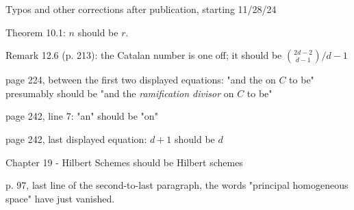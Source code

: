 Typos and other corrections after publication, starting 11/28/24

Theorem 10.1: $n$ should be $r$.

Remark 12.6 (p. 213): the Catalan number is one off; it should be $\binom{2d-2}{d-1}/d-1$

page 224, between the first two displayed equations: "and the on $C$ to be" presumably should be "and the \emph{ramification divisor} on $C$ to be"

page 242, line 7: "an" should be "on"

page 242, last displayed equation: $d+1$ should be $d$

Chapter 19 - Hilbert Schemes should be Hilbert schemes

p. 97, last line of the second-to-last paragraph, the words "principal homogeneous space" have just vanished.